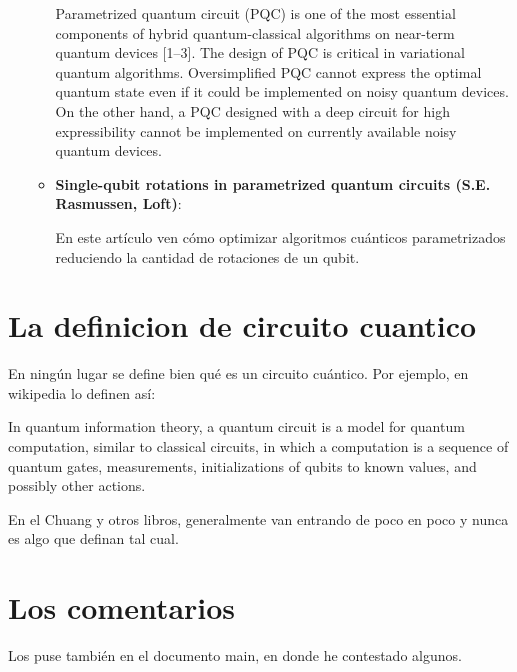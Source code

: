 \documentclass[10pt,letterpaper]{article} %
\begin{document}
\begin{itemize}
\begin{itemize}
Parametrized quantum circuit (PQC) is one of the most essential components of hybrid quantum-classical
algorithms on near-term quantum devices [1–3]. 
The design of PQC is critical in variational quantum algorithms. Oversimplified PQC cannot express
the optimal quantum state even if it could be implemented on noisy quantum devices. On the other
hand, a PQC designed with a deep circuit for high expressibility cannot be implemented on currently available noisy quantum devices.\\

\item  \textbf{Single-qubit rotations in parametrized quantum circuits (S.E. Rasmussen, Loft)}:

En este art\'iculo ven c\'omo optimizar algoritmos cu\'anticos parametrizados reduciendo la cantidad de rotaciones de un qubit.

\end{itemize}







\end{itemize}



\newpage
\section{La definicion de circuito cuantico}

En ningún lugar se define bien qué es un circuito cuántico. Por ejemplo, en wikipedia lo definen así:

In quantum information theory, a quantum circuit is a model for quantum computation, similar to classical circuits, in which a computation is a sequence of quantum gates, measurements, initializations of qubits to known values, and possibly other actions. 

En el Chuang y otros libros, generalmente van entrando de poco en poco y nunca es algo que definan tal cual.


\newpage
\section{Los comentarios}
Los puse también en el documento main, en donde he contestado algunos.
\end{document}
